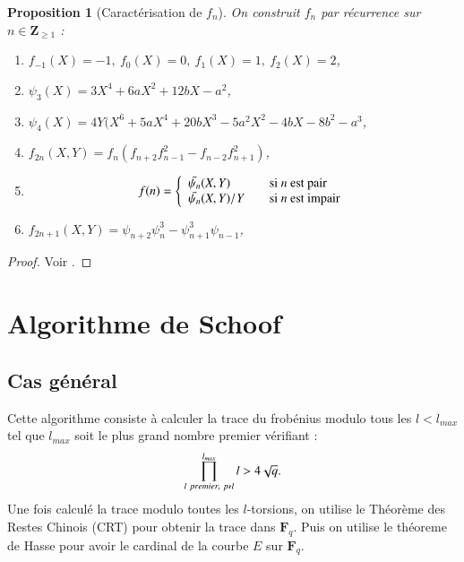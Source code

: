 \documentclass{article}%
\theoremstyle{plain}
\theoremstyle{definition}
\theoremstyle{plain}
\newtheorem{proposition}{Proposition}[section]
\theoremstyle{remark}
\newcommand\fq{\mathbf{F}_{q}}
\begin{document}
\begin{proposition}[Caractérisation de $f_{n}$]
On construit $f_{n}$ par récurrence sur $n\in\mathbf{Z}_{\geq 1}$ :
\begin{enumerate}
\item $f_{-1}(X)=-1,\ f_{0}(X)=0,\ f_{1}(X)=1,\ f_{2}(X)=2$,
\item $\psi_{3}(X)=3X^{4} + 6aX^{2} + 12bX - a^{2}$,
\item $\psi_{4}(X)=4Y(X^{6} + 5aX^{4} + 20bX^{3} - 5a^{2}X^{2} - 4bX - 8b^{2} - a^{3}$,
\item $f_{2n}(X,Y)=f_{n}(f_{n+2}f_{n-1}^{2} - f_{n-2}f_{n+1}^{2})$,

\item $$
f(n) = \left\{ 
\begin{array}{l l}
  \bar{\psi_{n}}(X,Y) & \quad \text{si } n \text{ est pair}\\
  \bar{\psi_{n}}(X,Y)/Y & \quad \text{si } n \text{ est impair}\\ \end{array} \right.
$$


\item $f_{2n+1}(X,Y)=\psi_{n+2}\psi_{n}^{3} - \psi_{n+1}^{3}\psi_{n-1}$,
\end{enumerate}
\end{proposition}

\begin{proof}
Voir \cite{ref4}.
\end{proof}






\clearpage
\section{Algorithme de Schoof}
\subsection{Cas général}

Cette algorithme consiste à calculer la trace du frobénius modulo tous les $l<l_{max}$ tel que $l_{max}$ soit le plus grand nombre premier vérifiant :\begin{equation} 
\prod_{l\ premier,\ p\nshortmid l}^{l_{max}}l > 4\sqrt{q}.
\end{equation}
Une fois calculé la trace modulo toutes les $l$-torsions, on utilise le Théorème des Restes Chinois (CRT) pour obtenir la trace dans $\fq$. Puis on utilise le théoreme de Hasse pour avoir le cardinal de la courbe $E$ sur $\fq$.
\end{document}
